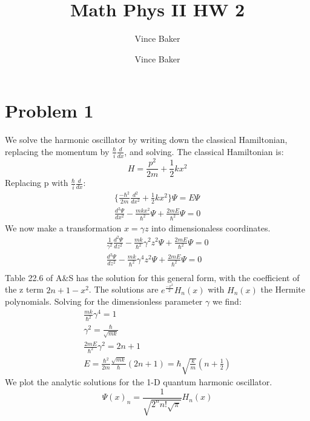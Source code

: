 \documentclass[a4paper,10pt]{article}
\title{Math Phys II HW 2}
\author{Vince Baker}
\title{}
\author{Vince Baker}
\numberwithin{equation}{section}
\begin{document}
\maketitle

\begin{abstract}

\end{abstract}

\section{Problem 1}
We solve the harmonic oscillator by writing down the classical Hamiltonian, replacing the momentum by $\frac{\hbar}{i}\frac{d}{dx}$, and solving.
The classical Hamiltonian is:
\begin{equation}
H=\frac{p^2}{2m}+\frac{1}{2}kx^2
\end{equation}
Replacing p with $\frac{\hbar}{i}\frac{d}{dx}$:
\begin{gather}
\{ \frac{-\hbar ^2}{2m}\frac{d^2}{dx ^2}+\frac{1}{2}kx^2\}\Psi=E\Psi\\
\frac{d^2 \Psi}{dx^2}-\frac{mkx^2}{\hbar ^2}\Psi+\frac{2mE}{\hbar^2}\Psi=0
\end{gather}
We now make a transformation $x=\gamma z$ into dimensionaless coordinates.
\begin{gather}
\frac{1}{\gamma ^2}\frac{d^2 \Psi}{dz^2}-\frac{mk}{\hbar ^2}\gamma^2z^2\Psi+\frac{2mE}{\hbar^2}\Psi=0\\ 
\frac{d^2 \Psi}{dz^2}-\frac{mk}{\hbar ^2}\gamma^4z^2\Psi+\frac{2mE}{\hbar^2}\Psi=0\\ 
\end{gather}
Table 22.6 of A\&S has the solution for this general form, with the coefficient of the z term $2n+1-x^2$.
The solutions are $e^{\frac{-x^2}{2}}H_n(x)$ with $H_n(x)$ the Hermite polynomials. 
Solving for the dimensionless parameter $\gamma$ we find:
\begin{gather}
\frac{mk}{\hbar ^2} \gamma ^4=1\\
\gamma ^2=\frac{\hbar }{\sqrt{mk}}\\
\frac{2mE}{\hbar ^2}\gamma ^2=2n+1\\
E=\frac{\hbar ^2}{2m}\frac{\sqrt{mk}}{\hbar}(2n+1)=\hbar \sqrt{\frac{k}{m}}(n+\frac{1}{2})
\end{gather}
We plot the analytic solutions for the 1-D quantum harmonic oscillator. 
\begin{equation}
 \Psi(x)_n=\frac{1}{\sqrt{2^n n! \sqrt{\pi}}}H_n(x)
\end{equation}
\end{document}
